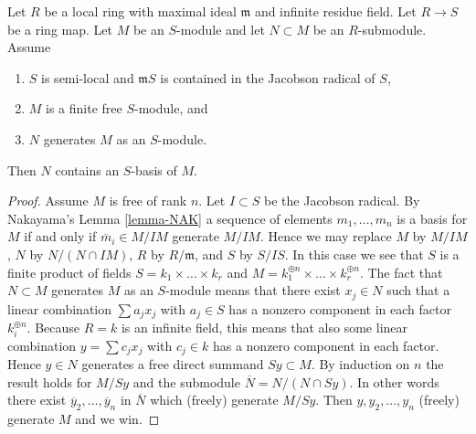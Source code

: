 \begin{lemma}
\label{lemma-semi-local-module-basis-in-submodule}
Let $R$ be a local ring with maximal ideal $\mathfrak m$ and
infinite residue field.
Let $R \to S$ be a ring map.
Let $M$ be an $S$-module and let $N \subset M$ be an $R$-submodule.
Assume
\begin{enumerate}
\item $S$ is semi-local and $\mathfrak mS$ is contained in the
Jacobson radical of $S$,
\item $M$ is a finite free $S$-module, and
\item $N$ generates $M$ as an $S$-module.
\end{enumerate}
Then $N$ contains an $S$-basis of $M$.
\end{lemma}

\begin{proof}
Assume $M$ is free of rank $n$. Let $I \subset S$ be the Jacobson radical.
By Nakayama's Lemma \ref{lemma-NAK} a sequence of elements
$m_1, \ldots, m_n$ is a basis for $M$ if and only if
$\overline{m}_i \in M/IM$ generate $M/IM$. Hence we may replace
$M$ by $M/IM$, $N$ by $N/(N \cap IM)$, $R$ by $R/\mathfrak m$,
and $S$ by $S/IS$. In this case we see that $S$ is a finite product
of fields $S = k_1 \times \ldots \times k_r$ and
$M = k_1^{\oplus n} \times \ldots \times k_r^{\oplus n}$.
The fact that $N \subset M$ generates $M$ as an $S$-module
means that there exist $x_j \in N$ such that a linear combination
$\sum a_j x_j$ with $a_j \in S$ has a nonzero component in each
factor $k_i^{\oplus n}$.
Because $R = k$ is an infinite field, this means that also
some linear combination $y = \sum c_j x_j$ with $c_j \in k$ has a
nonzero component in each factor. Hence $y \in N$ generates a
free direct summand $Sy \subset M$. By induction on $n$ the result
holds for $M/Sy$ and the submodule $\overline{N} = N/(N \cap Sy)$.
In other words there exist $\overline{y}_2, \ldots, \overline{y}_n$
in $\overline{N}$ which (freely) generate $M/Sy$. Then
$y, y_2, \ldots, y_n$ (freely) generate $M$ and we win.
\end{proof}
